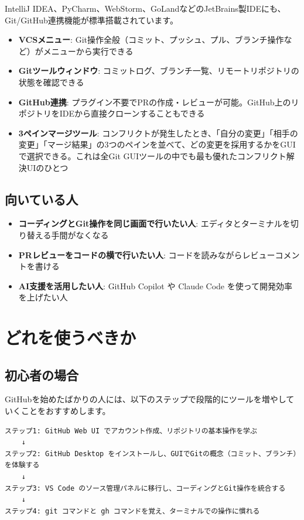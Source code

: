IntelliJ IDEA、PyCharm、WebStorm、GoLandなどのJetBrains製IDEにも、Git/GitHub連携機能が標準搭載されています。

\begin{itemize}
  \item \textbf{VCSメニュー}: Git操作全般（コミット、プッシュ、プル、ブランチ操作など）がメニューから実行できる
  \item \textbf{Gitツールウィンドウ}: コミットログ、ブランチ一覧、リモートリポジトリの状態を確認できる
  \item \textbf{GitHub連携}: プラグイン不要でPRの作成・レビューが可能。GitHub上のリポジトリをIDEから直接クローンすることもできる
  \item \textbf{3ペインマージツール}: コンフリクトが発生したとき、「自分の変更」「相手の変更」「マージ結果」の3つのペインを並べて、どの変更を採用するかをGUIで選択できる。これは全Git GUIツールの中でも最も優れたコンフリクト解決UIのひとつ
\end{itemize}

\subsection{向いている人}

\begin{itemize}
  \item \textbf{コーディングとGit操作を同じ画面で行いたい人}: エディタとターミナルを切り替える手間がなくなる
  \item \textbf{PRレビューをコードの横で行いたい人}: コードを読みながらレビューコメントを書ける
  \item \textbf{AI支援を活用したい人}: GitHub Copilot や Claude Code を使って開発効率を上げたい人
\end{itemize}

\section{どれを使うべきか}

\subsection{初心者の場合}

GitHubを始めたばかりの人には、以下のステップで段階的にツールを増やしていくことをおすすめします。

\begin{lstlisting}[language={}]
ステップ1: GitHub Web UI でアカウント作成、リポジトリの基本操作を学ぶ
    ↓
ステップ2: GitHub Desktop をインストールし、GUIでGitの概念（コミット、ブランチ）を体験する
    ↓
ステップ3: VS Code のソース管理パネルに移行し、コーディングとGit操作を統合する
    ↓
ステップ4: git コマンドと gh コマンドを覚え、ターミナルでの操作に慣れる
\end{lstlisting}

